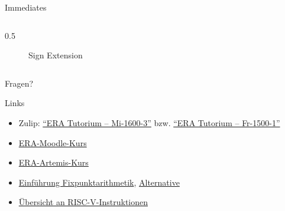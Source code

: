 \begin{frame}[c]{Immediates}{}
\begin{columns}[c]
\begin{column}{0.5\textwidth}
\begin{center}
\begin{figure}
					\caption{Sign Extension}
				\end{figure}
			\end{center}
		\end{column}
	\end{columns}
\end{frame}

\begin{frame}[c]{}{}
	\begin{center}
		\LARGE Fragen?
	\end{center}
\end{frame}


\begin{frame}[fragile, c]{Links}{}
	\begin{itemize}
		\item Zulip: \href{https://zulip.in.tum.de/#narrow/channel/3255-ERA-Tutorium-.E2.80.93-Mi-1600-3}{\enquote{ERA Tutorium -- Mi-1600-3}}
		      bzw. \href{https://zulip.in.tum.de/#narrow/channel/3264-ERA-Tutorium-.E2.80.93-Fr-1500-1}{\enquote{ERA Tutorium -- Fr-1500-1}}
		\item \href{https://www.moodle.tum.de/course/view.php?id=111440}{ERA-Moodle-Kurs}
		\item \href{https://artemis.in.tum.de/courses/516}{ERA-Artemis-Kurs}
		\item \href{https://vanhunteradams.com/FixedPoint/FixedPoint.html}{Einführung Fixpunktarithmetik}, \href{https://specbranch.com/posts/fixed-point/}{Alternative}
		\item \href{https://msyksphinz-self.github.io/riscv-isadoc/html/index.html}{Übersicht an RISC-V-Instruktionen}
	\end{itemize}
\end{frame}

\maketitle


